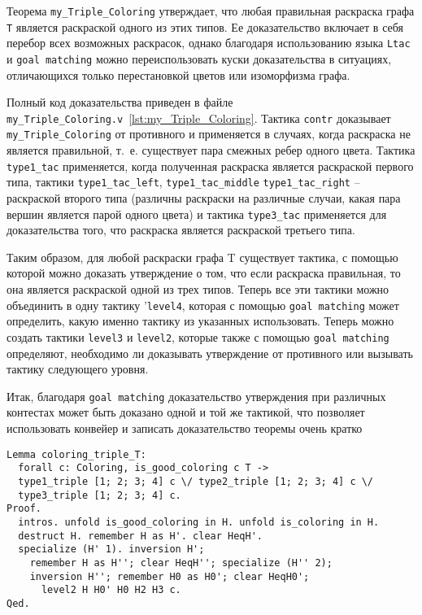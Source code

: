 Теорема {\tt my\_Triple\_Coloring} утверждает, что любая правильная раскраска графа {\tt T} является раскраской одного из этих типов. Ее доказательство включает в себя перебор всех возможных раскрасок, однако благодаря использованию языка {\tt Ltac} и {\tt goal matching} можно переиспользовать куски доказательства в ситуациях, отличающихся только перестановкой цветов или изоморфизма графа.

Полный код доказательства приведен в файле {\tt my\_Triple\_Coloring.v}~\ref{lst:my_Triple_Coloring}. Тактика {\tt contr} доказывает {\tt my\_Triple\_Coloring} от противного и применяется в случаях, когда раскраска не является правильной, т.~е. существует пара смежных ребер одного цвета. Тактика {\tt type1\_tac} применяется, когда полученная раскраска является раскраской первого типа, тактики {\tt type1\_tac\_left}, {\tt type1\_tac\_middle} {\tt type1\_tac\_right} -- раскраской второго типа (различны раскраски на различные случаи, какая пара вершин является парой одного цвета) и тактика {\tt type3\_tac} применяется для доказательства того, что раскраска является раскраской третьего типа.

Таким образом, для любой раскраски графа T существует тактика, с помощью которой можно доказать утверждение о том, что если раскраска правильная, то она является раскраской одной из трех типов. Теперь все эти тактики можно объединить в одну тактику {'\tt level4}, которая с помощью {\tt goal matching} может определить, какую именно тактику из указанных использовать. Теперь можно создать тактики {\tt level3} и {\tt level2}, которые также с помощью {\tt goal matching} определяют, необходимо ли доказывать утверждение от противного или вызывать тактику следующего уровня.

Итак, благодаря {\tt goal matching} доказательство утверждения при различных контестах может быть доказано одной и той же тактикой, что позволяет использовать конвейер и записать доказательство теоремы очень кратко

\begin{verbatim}
Lemma coloring_triple_T:
  forall c: Coloring, is_good_coloring c T ->
  type1_triple [1; 2; 3; 4] c \/ type2_triple [1; 2; 3; 4] c \/
  type3_triple [1; 2; 3; 4] c.
Proof.
  intros. unfold is_good_coloring in H. unfold is_coloring in H. 
  destruct H. remember H as H'. clear HeqH'. 
  specialize (H' 1). inversion H';
    remember H as H''; clear HeqH''; specialize (H'' 2); 
    inversion H''; remember H0 as H0'; clear HeqH0';
      level2 H H0' H0 H2 H3 c.
Qed.
\end{verbatim}

